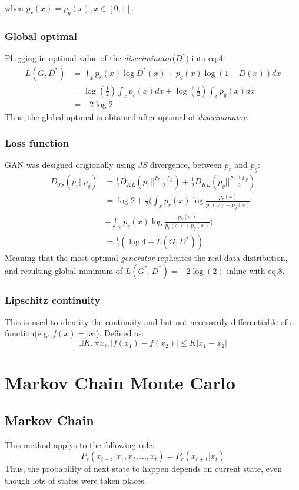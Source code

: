 \documentclass{article}
\begin{document}
when $p_{r}(x) = p_{g}(x), x\in [0,1]$.
\subsubsection*{Global optimal}
Plugging in optimal value of the \textit{discriminator}($D^*$) into eq.4:
\begin{align}
    \textit{L}(G,D^*) &= \int_{x}p_{r}(x)\log{D^*(x)} + p_{g}(x)\log{(1-D(x))}dx \\
    &=\log(\frac{1}{2})\int_{x}p_{r}(x)dx + \log(\frac{1}{2})\int_{x}p_{g}(x)dx\\
    &=-2\log{2}
\end{align}
Thus, the global optimal is obtained after optimal of \textit{discriminator}.
\subsubsection*{Loss function}
GAN was designed origionally using $JS$ divergence, between $p_{r}$ and $p_{g}$:
\begin{align}
    D_{JS}(p_{r}||p_{g}) &= \frac{1}{2}D_{KL}(p_{r}||\frac{p_{r}+p_{g}}{2}) + \frac{1}{2}D_{KL}(p_{g}||\frac{p_{r}+p_{g}}{2}) \\
    &= \log{2} + \frac{1}{2}(\int_{x}p_{r}(x)\log{
        \frac{p_{r}(x)}{p_{r}(x)+p_{g}(x)}}\\
        &+\int_{x}p_{g}(x)\log{\frac{p_{g}(x)}{p_{r}(x)+p_{g}(x)}})\\
    &= \frac{1}{2}(\log{4}+L(G,D^*))    
\end{align}
Meaning that the most optimal \textit{generator} replicates the real data distribution, and resulting global minimum of $L(G^*,D^*) = -2\log(2)$ inline with eq.8.
\subsubsection*{Lipschitz continuity}
This is used to identity the continuity and but not necessarily differentiable of a function(e.g. $f(x) = |x|$). Defined as:
\[
\exists K, \forall x_{i}, |f(x_{1}) - f(x_{2})| \leq K|x_{1}-x_{2}|    
\]
\section{Markov Chain Monte Carlo}
\subsection{Markov Chain}
This method applys to the following rule:
\[
P_{r}(x_{t+1}|x_{1},x_{2},\dots ,x_{t}) = P_{r}(x_{t+1}|x_{t})
\]
Thus, the probability of next state to happen depends on current state, even though lots of states were taken places.
\end{document}
